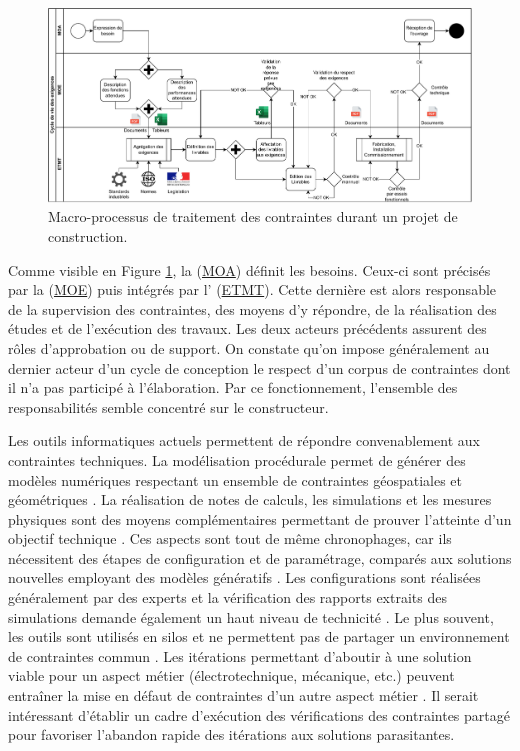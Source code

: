 \documentclass[a4paper,12pt]{article}
\begin{document}
\begin{figure}[htbp]
\centering
\includegraphics[width=.9\linewidth]{../svg/BPMN-LifeCycle-Exigences-init.pdf}
\caption{\label{fig:orgca8d314}Macro-processus de traitement des contraintes durant un projet de construction.}
\end{figure}

Comme visible en Figure \ref{fig:orgca8d314}, la  (\protect\hyperlink{gls-8}{\label{gls-8-use-1}MOA}) définit les besoins. Ceux-ci sont précisés par la  (\protect\hyperlink{gls-9}{\label{gls-9-use-1}MOE}) puis intégrés par l'  (\protect\hyperlink{gls-10}{\label{gls-10-use-1}ETMT}). Cette dernière est alors responsable de la supervision des contraintes, des moyens d’y répondre, de la réalisation des études et de l'exécution des travaux. Les deux acteurs précédents assurent des rôles d'approbation ou de support. On constate qu’on impose généralement au dernier acteur d’un cycle de conception le respect d’un corpus de contraintes dont il n’a pas participé à l’élaboration. Par ce fonctionnement, l’ensemble des responsabilités semble concentré sur le constructeur.

Les outils informatiques actuels permettent de répondre convenablement aux contraintes techniques. La modélisation procédurale permet de générer des modèles numériques respectant un ensemble de contraintes géospatiales et géométriques \autocite{s.dineshkumarBIMbasedAutomatedSite2015}. La réalisation de notes de calculs, les simulations et les mesures physiques sont des moyens complémentaires permettant de prouver l’atteinte d’un objectif technique \autocite{tomc.borstBIMSimulation2015,galSimulationEnergetiqueDynamique2025a}. Ces aspects sont tout de même chronophages, car ils nécessitent des étapes de configuration et de paramétrage, comparés aux solutions nouvelles employant des modèles génératifs \autocite{chaillouLintelligenceArtificielleAu2021a}. Les configurations sont réalisées généralement par des experts et la vérification des rapports extraits des simulations demande également un haut niveau de technicité \autocite{delsavioVirtualDesignConstruction2022}. Le plus souvent, les outils sont utilisés en silos et ne permettent pas de partager un environnement de contraintes commun \autocite{moreauConceptionElectriqueQuelles2019a}. Les itérations permettant d’aboutir à une solution viable pour un aspect métier (électrotechnique, mécanique, etc.) peuvent entraîner la mise en défaut de contraintes d’un autre aspect métier \autocite{vandebrugInterdisciplinaryConfigurationMethods2025a}. Il serait intéressant d’établir un cadre d'exécution des vérifications des contraintes partagé pour favoriser l’abandon rapide des itérations aux solutions parasitantes.
\end{document}
